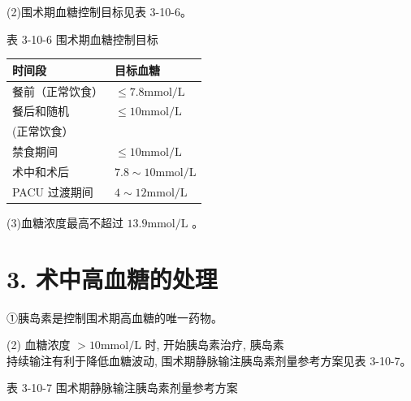 \documentclass[10pt]{article}
\begin{document}
(2)围术期血糖控制目标见表 3-10-6。

表 3-10-6 围术期血糖控制目标

\begin{center}
\begin{tabular}{ll}
\hline
时间段 & 目标血糖 \\
\hline
餐前（正常饮食） & $\leqslant 7.8 \mathrm{mmol} / \mathrm{L}$ \\
餐后和随机 & $\leqslant 10 \mathrm{mmol} / \mathrm{L}$ \\
(正常饮食） &  \\
禁食期间 & $\leqslant 10 \mathrm{mmol} / \mathrm{L}$ \\
术中和术后 & $7.8 \sim 10 \mathrm{mmol} / \mathrm{L}$ \\
PACU 过渡期间 & $4 \sim 12 \mathrm{mmol} / \mathrm{L}$ \\
\hline
\end{tabular}
\end{center}

(3)血糖浓度最高不超过 $13.9 \mathrm{mmol} / \mathrm{L}$ 。

\section*{3. 术中高血糖的处理}
①胰岛素是控制围术期高血糖的唯一药物。

(2) 血糖浓度 $>10 \mathrm{mmol} / \mathrm{L}$ 时, 开始胰岛素治疗, 胰岛素\\
持续输注有利于降低血糖波动, 围术期静脉输注胰岛素剂量参考方案见表 3-10-7。

表 3-10-7 围术期静脉输注胰岛素剂量参考方案
\end{document}
